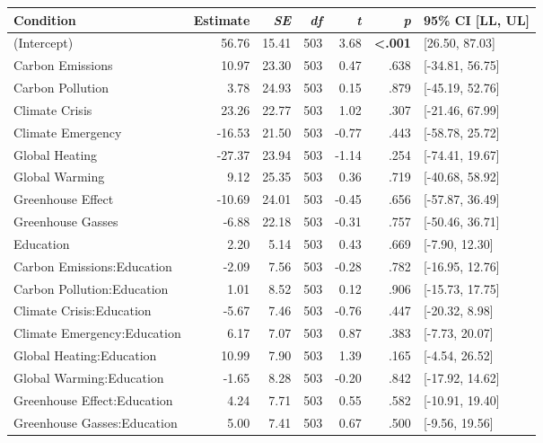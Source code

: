 \begin{table}[ht]
\centering
\begin{tabular}{lrrrrrl}
  \hline
Condition & Estimate & \textit{SE} & \textit{df} & \textit{t} & \textit{p} & 95\% CI [LL, UL] \\ 
  \hline
(Intercept) & 56.76 & 15.41 & 503 & 3.68 & \textbf{\textless  .001} & [26.50, 87.03] \\ 
  Carbon Emissions & 10.97 & 23.30 & 503 & 0.47 & .638 & [-34.81, 56.75] \\ 
  Carbon Pollution & 3.78 & 24.93 & 503 & 0.15 & .879 & [-45.19, 52.76] \\ 
  Climate Crisis & 23.26 & 22.77 & 503 & 1.02 & .307 & [-21.46, 67.99] \\ 
  Climate Emergency & -16.53 & 21.50 & 503 & -0.77 & .443 & [-58.78, 25.72] \\ 
  Global Heating & -27.37 & 23.94 & 503 & -1.14 & .254 & [-74.41, 19.67] \\ 
  Global Warming & 9.12 & 25.35 & 503 & 0.36 & .719 & [-40.68, 58.92] \\ 
  Greenhouse Effect & -10.69 & 24.01 & 503 & -0.45 & .656 & [-57.87, 36.49] \\ 
  Greenhouse Gasses & -6.88 & 22.18 & 503 & -0.31 & .757 & [-50.46, 36.71] \\ 
  Education & 2.20 & 5.14 & 503 & 0.43 & .669 & [-7.90, 12.30] \\ 
  Carbon Emissions:Education & -2.09 & 7.56 & 503 & -0.28 & .782 & [-16.95, 12.76] \\ 
  Carbon Pollution:Education & 1.01 & 8.52 & 503 & 0.12 & .906 & [-15.73, 17.75] \\ 
  Climate Crisis:Education & -5.67 & 7.46 & 503 & -0.76 & .447 & [-20.32, 8.98] \\ 
  Climate Emergency:Education & 6.17 & 7.07 & 503 & 0.87 & .383 & [-7.73, 20.07] \\ 
  Global Heating:Education & 10.99 & 7.90 & 503 & 1.39 & .165 & [-4.54, 26.52] \\ 
  Global Warming:Education & -1.65 & 8.28 & 503 & -0.20 & .842 & [-17.92, 14.62] \\ 
  Greenhouse Effect:Education & 4.24 & 7.71 & 503 & 0.55 & .582 & [-10.91, 19.40] \\ 
  Greenhouse Gasses:Education & 5.00 & 7.41 & 503 & 0.67 & .500 & [-9.56, 19.56] \\ 
   \hline
\end{tabular}
\end{table}
